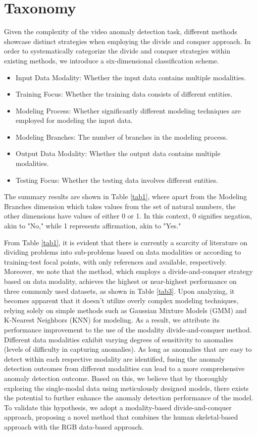 \documentclass[conference]{IEEEtran}
\begin{document}
\section{Taxonomy}
Given the complexity of the video anomaly detection task, different methods showcase distinct strategies when employing the divide and conquer approach. In order to systematically categorize the divide and conquer strategies within existing methods, we introduce a six-dimensional classification scheme.
\begin{itemize}
\item Input Data Modality: Whether the input data contains multiple modalities.
\item Training Focus: Whether the training data consists of different entities.
\item Modeling Process: Whether significantly different modeling techniques are employed for modeling the input data.
\item Modeling Branches: The number of branches in the modeling process.
\item Output Data Modality: Whether the output data contains multiple modalities.
\item Testing Focus: Whether the testing data involves different entities.
\end{itemize}
The summary results are shown in Table \ref{tab1}, where apart from the Modeling Branches dimension which takes values from the set of natural numbers, the other dimensions have values of either 0 or 1. In this context, 0 signifies negation, akin to "No," while 1 represents affirmation, akin to "Yes."

From Table \ref{tab1}, it is evident that there is currently a scarcity of literature on dividing problems into sub-problems based on data modalities or according to training-test focal points, with only references\cite{attribute} and\cite{hierarchical} available, respectively. Moreover, we note that the method\cite{attribute}, which employs a divide-and-conquer strategy based on data modality, achieves the highest or near-highest performance on three commonly used datasets, as shown in Table \ref{tab3}. Upon analyzing\cite{attribute}, it becomes apparent that it doesn't utilize overly complex modeling techniques, relying solely on simple methods such as Gaussian Mixture Models (GMM) and K-Nearest Neighbors (KNN) for modeling. As a result, we attribute its performance improvement to the use of the modality divide-and-conquer method. Different data modalities exhibit varying degrees of sensitivity to anomalies (levels of difficulty in capturing anomalies). As long as anomalies that are easy to detect within each respective modality are identified, fusing the anomaly detection outcomes from different modalities can lead to a more comprehensive anomaly detection outcome. Based on this, we believe that by thoroughly exploring the single-modal data using meticulously designed models, there exists the potential to further enhance the anomaly detection performance of the model. To validate this hypothesis, we adopt a modality-based divide-and-conquer approach, proposing a novel method that combines the human skeletal-based approach with the RGB data-based approach.
\end{document}
